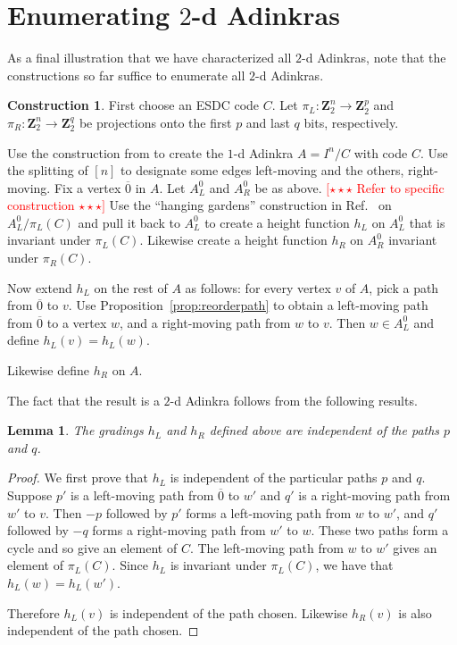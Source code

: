\documentclass[12pt,twoside,singlespace]{article}
\numberwithin{equation}{section}
\newtheorem{lem}[equation]{Lemma}
\theoremstyle{definition}
\newtheorem{construction}[equation]{Construction}
\newcommand{\ZZ}{\mathbf{Z}}
\newcommand{\com}[1]{\textcolor{red}{$[\star \star \star$ #1 $\star \star \star]$}}
\begin{document}
\section{Enumerating $2$-d Adinkras}
As a final illustration that we have characterized all $2$-d Adinkras, note that the constructions so far suffice to enumerate all $2$-d Adinkras.

\begin{construction}
First choose an ESDC code $C$.  Let $\pi_L:\ZZ_2^n\to\ZZ_2^p$ and $\pi_R:\ZZ_2^n\to\ZZ_2^q$ be projections onto the first $p$ and last $q$ bits, respectively.

Use the construction from \cite{rAT2} to create the $1$-d Adinkra $A=I^n/C$ with code $C$.  Use the splitting of $[n]$ to designate some edges left-moving and the others, right-moving.  Fix a vertex $\overline{0}$ in $A$.  Let $A_L^0$ and $A_R^0$ be as above. \com{Refer to specific construction}  Use the ``hanging gardens'' construction in Ref.~\cite{hgt} on $A_L^0/\pi_L(C)$ and pull it back to $A_L^0$ to create a height function $h_L$ on $A_L^0$ that is invariant under $\pi_L(C)$.  Likewise create a height function $h_R$ on $A_R^0$ invariant under $\pi_R(C)$.

Now extend $h_L$ on the rest of $A$ as follows: for every vertex $v$ of $A$, pick a path from $\overline{0}$ to $v$.  Use Proposition~\ref{prop:reorderpath} to obtain a left-moving path from $\overline{0}$ to a vertex $w$, and a right-moving path from $w$ to $v$.  Then $w\in A_L^0$ and define $h_L(v)=h_L(w)$.

Likewise define $h_R$ on $A$.
\end{construction}

The fact that the result is a $2$-d Adinkra follows from the following results.

\begin{lem}
The gradings $h_L$ and $h_R$ defined above are independent of the paths $p$ and $q$.\label{lem:indep}
\end{lem}

\begin{proof}
We first prove that $h_L$ is independent of the particular paths $p$ and $q$.  Suppose $p'$ is a left-moving path from $\overline{0}$ to $w'$ and $q'$ is a right-moving path from $w'$ to $v$.  Then $-p$ followed by $p'$ forms a left-moving path from $w$ to $w'$, and $q'$ followed by $-q$ forms a right-moving path from $w'$ to $w$.  These two paths form a cycle and so give an element of $C$.  The left-moving path from $w$ to $w'$ gives an element of $\pi_L(C)$.  Since $h_L$ is invariant under $\pi_L(C)$, we have that $h_L(w)=h_L(w')$.

Therefore $h_L(v)$ is independent of the path chosen.  Likewise $h_R(v)$ is also independent of the path chosen.
\end{proof}
\end{document}
